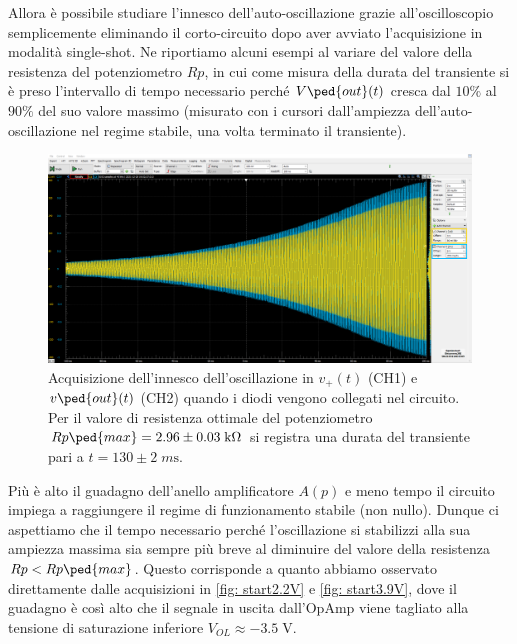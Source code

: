 \documentclass[10pt, a4paper, italian]{article}
\begin{document}
Allora è possibile studiare l'innesco dell'auto-oscillazione grazie
all'oscilloscopio semplicemente eliminando il corto-circuito dopo aver avviato
l'acquisizione in modalità single-shot. Ne riportiamo alcuni esempi al
variare del valore della resistenza del potenziometro $Rp$, in cui come misura
della durata del transiente si è preso l'intervallo di tempo necessario perché
$V\ped{out} (t)$ cresca dal $10\%$ al $90\%$ del suo valore massimo (misurato
con i cursori dall'ampiezza dell'auto-oscillazione nel regime stabile, una
volta terminato il transiente).
\begin{figure}[htbp]
	\centering
	\includegraphics[width=\textwidth]{propR9}
	\caption{Acquisizione dell'innesco dell'oscillazione in $v_+ (t)$ (CH1) e
	$v\ped{out} (t)$ (CH2) quando i diodi vengono collegati nel circuito.
	Per il valore di resistenza ottimale del potenziometro
	$Rp\ped{max} = 2.96 \pm 0.03 \; \si{k\ohm}$ si registra una durata del
	transiente pari a $t = 130 \pm 2 \; \si{m\s}$.
	\label{fig: startmax}}
\end{figure}

Più è alto il guadagno dell'anello amplificatore $A(p)$ e meno tempo il
circuito impiega a raggiungere il regime di funzionamento stabile (non nullo).
Dunque ci aspettiamo che il tempo necessario perché l'oscillazione si
stabilizzi alla sua ampiezza massima sia sempre più breve al diminuire del
valore della resistenza $Rp < Rp\ped{max}$. Questo corrisponde a quanto
abbiamo osservato direttamente dalle acquisizioni in \cref{fig: start2.2V}
e \cref{fig: start3.9V}, dove il guadagno è così alto che il segnale in
uscita dall'OpAmp viene tagliato alla tensione di saturazione inferiore
$V_{OL} \approx -3.5 \; \si{\V}$.
\end{document}

